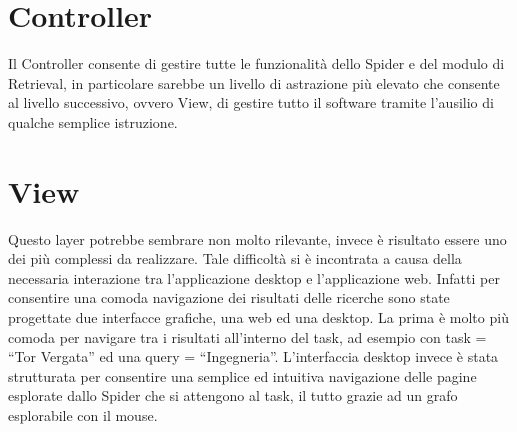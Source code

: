 \section{Controller}
Il Controller consente di gestire tutte le funzionalità dello Spider e del modulo di Retrieval, in particolare sarebbe un livello di astrazione più elevato che consente al livello successivo, ovvero View, di gestire tutto il software tramite l'ausilio di qualche semplice istruzione.
\section{View}
Questo layer potrebbe sembrare non molto rilevante, invece è risultato essere uno dei più complessi da realizzare. Tale difficoltà si è incontrata a causa della necessaria interazione tra l'applicazione desktop e l'applicazione web. Infatti per consentire una comoda navigazione dei risultati delle ricerche sono state progettate due interfacce grafiche, una web ed una desktop. La prima è molto più comoda per navigare tra i risultati all'interno del task, ad esempio con task = ``Tor Vergata'' ed una query = ``Ingegneria''. L'interfaccia desktop invece è stata strutturata per consentire una semplice ed intuitiva navigazione delle pagine esplorate dallo Spider che si attengono al task, il tutto grazie ad un grafo esplorabile con il mouse.
